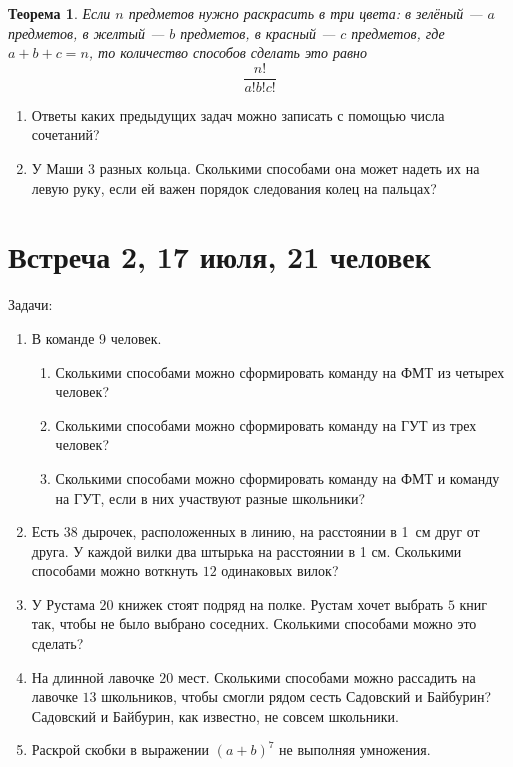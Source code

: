\documentclass[pdftex,12pt,a4paper]{article}
\newtheorem*{theorem}{Теорема}
\begin{document}
\begin{theorem}
Если $n$ предметов нужно раскрасить в три цвета: в зелёный --- $a$ предметов, в желтый --- $b$ предметов, в красный --- $c$ предметов, где $a+b+c=n$, то количество способов сделать это равно
\[
\frac{n!}{a!b!c!}
\]
\end{theorem}


\begin{enumerate}[resume]
\item Ответы каких предыдущих задач можно записать с помощью числа сочетаний?
\item У Маши 3 разных кольца. Сколькими способами она может надеть их на левую руку, если ей важен порядок следования колец на пальцах?
\end{enumerate}


\newpage
\section{Встреча 2, 17 июля, 21 человек}

Задачи:
\begin{enumerate}
\item В команде 9 человек. 
\begin{enumerate}
\item Сколькими способами можно сформировать команду на ФМТ из четырех человек?
\item Сколькими способами можно сформировать команду на ГУТ из трех человек?
\item Сколькими способами можно сформировать команду на ФМТ и команду на ГУТ, если в них участвуют разные школьники?
\end{enumerate}
\item Есть $38$ дырочек, расположенных в линию, на расстоянии в 1~см друг от друга. У каждой вилки два штырька на расстоянии в 1 см.
 Сколькими способами можно воткнуть $12$ одинаковых вилок?
\item У Рустама $20$ книжек стоят подряд на полке. Рустам хочет выбрать $5$ книг так, чтобы не было выбрано соседних. Сколькими способами можно это сделать?

\item На длинной лавочке $20$ мест. Сколькими способами можно рассадить на лавочке $13$ школьников, чтобы смогли рядом сесть Садовский и Байбурин? Садовский и Байбурин, как известно, не совсем школьники.

\item Раскрой скобки в выражении $(a+b)^7$ не выполняя умножения.
   
\end{enumerate}
\end{document}
